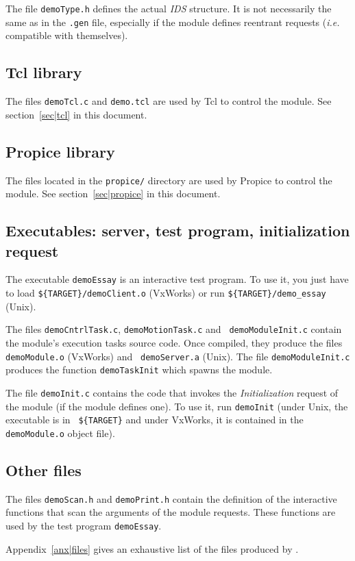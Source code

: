 The file {\tt  demoType.h} defines the actual {\em  IDS} structure. It is
not necessarily the same as  in the  {\tt .gen}  file, especially if  the
module   defines   reentrant   requests   ({\em  i.e.}   compatible  with
themselves).

\subsection{Tcl library}

The files  {\tt demoTcl.c} and {\tt demo.tcl}  are used by Tcl to control
the module. See section~\ref{sec|tcl} in this document.


\subsection{Propice library}

The files located in the {\tt propice/} directory are  used by Propice to
control the module. See section~\ref{sec|propice} in this document.


\subsection{Executables: server, test program, initialization request}

The executable {\tt demoEssay} is an interactive test program. To use it,
you just have to  load  {\tt \$\{TARGET\}/demoClient.o} (VxWorks)  or run
{\tt \$\{TARGET\}/demo\_essay} (Unix).

The  files    {\tt demoCntrlTask.c},   {\tt demoMotionTask.c}    and {\tt
demoModuleInit.c} contain the module's execution tasks source code.  Once
compiled, they produce the  files  {\tt demoModule.o} (VxWorks)  and {\tt
demoServer.a} (Unix).  The   file  {\tt demoModuleInit.c} produces    the
function {\tt demoTaskInit} which spawns the module.

The file {\tt demoInit.c} contains the code that invokes the {\em
Initialization} request of the module (if the module defines one). To use
it, run {\tt demoInit} (under Unix, the executable is in {\tt
\$\{TARGET\}} and under VxWorks, it is contained in the {\tt
demoModule.o} object file).


\subsection{Other files}

The  files {\tt demoScan.h} and {\tt  demoPrint.h} contain the definition
of  the interactive   functions  that scan  the  arguments  of the module
requests. These functions are used by the test program {\tt demoEssay}.

Appendix~\ref{anx|files} gives an exhaustive list  of the files  produced
by \GenoM.
